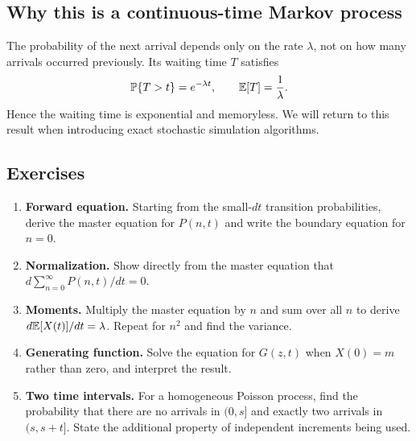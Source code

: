 \subsection{Why this is a continuous-time Markov process}
The probability of the next arrival depends only on the rate $\lambda$,
not on how many arrivals occurred previously. Its waiting time $T$ satisfies
\begin{equation}
 {\mathbb P}\{T>t\}=e^{-\lambda t},\qquad {\mathbb E}[T]=\frac{1}{\lambda}.
\end{equation}
Hence the waiting time is exponential and memoryless. We will return to this
result when introducing exact stochastic simulation algorithms.

\subsection{Exercises}
\begin{enumerate}[label=\textbf{Exercise \arabic*.},leftmargin=*]
 \item \textbf{Forward equation.} Starting from the small-$dt$ transition
 probabilities, derive the master equation for $P(n,t)$ and write the
 boundary equation for $n=0$.
 \item \textbf{Normalization.} Show directly from the master equation that
 $d\sum_{n=0}^{\infty}P(n,t)/dt=0$.
 \item \textbf{Moments.} Multiply the master equation by $n$ and sum over
 all $n$ to derive $d{\mathbb E}[X(t)]/dt=\lambda$. Repeat for $n^2$ and find
 the variance.
 \item \textbf{Generating function.} Solve the equation for $G(z,t)$
 when $X(0)=m$ rather than zero, and interpret the result.
 \item \textbf{Two time intervals.} For a homogeneous Poisson process,
 find the probability that there are no arrivals in $(0,s]$ and exactly
 two arrivals in $(s,s+t]$. State the additional property of independent
 increments being used.
\end{enumerate}

